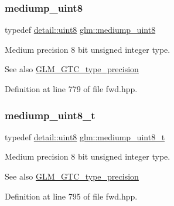 \subsubsection{\texorpdfstring{mediump\+\_\+uint8}{mediump\_uint8}}
{\footnotesize\ttfamily typedef \hyperlink{namespaceglm_1_1detail_aef2588f97d090cc19fbbe0c74fe17c8f}{detail\+::uint8} \hyperlink{group__gtc__type__precision_gac4b849eaac0543a10f97f4bdda4850a8}{glm\+::mediump\+\_\+uint8}}

Medium precision 8 bit unsigned integer type. \begin{DoxySeeAlso}{See also}
\hyperlink{group__gtc__type__precision}{G\+L\+M\+\_\+\+G\+T\+C\+\_\+type\+\_\+precision} 
\end{DoxySeeAlso}


Definition at line 779 of file fwd.\+hpp.

\mbox{\label{group__gtc__type__precision_gadfa38f3c245d371c4b2079f1fd68928b}} 
\subsubsection{\texorpdfstring{mediump\+\_\+uint8\+\_\+t}{mediump\_uint8\_t}}
{\footnotesize\ttfamily typedef \hyperlink{namespaceglm_1_1detail_aef2588f97d090cc19fbbe0c74fe17c8f}{detail\+::uint8} \hyperlink{group__gtc__type__precision_gadfa38f3c245d371c4b2079f1fd68928b}{glm\+::mediump\+\_\+uint8\+\_\+t}}

Medium precision 8 bit unsigned integer type. \begin{DoxySeeAlso}{See also}
\hyperlink{group__gtc__type__precision}{G\+L\+M\+\_\+\+G\+T\+C\+\_\+type\+\_\+precision} 
\end{DoxySeeAlso}


Definition at line 795 of file fwd.\+hpp.

\mbox{\label{group__gtc__type__precision_ga1b734d715033ab3026b2fb27e1fb7d3e}} 
